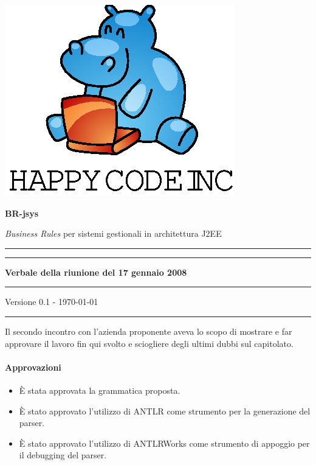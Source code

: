 \documentclass[11pt,titlepage,a4paper]{report}
\begin{document}
\begin{titlepage}
\begin{center}
\vspace*{0.5in}
\includegraphics{logo.eps}
\vspace*{0.2in}

{\Large \textbf{BR-jsys}}

{\Large \emph{Business Rules} per sistemi gestionali in architettura J2EE } 
\vspace{1.3in}
\par\rule{10cm}{.4pt} \par
\par\rule{12cm}{1pt} \par
\vspace*{0.5in}
\LARGE \textbf {Verbale della riunione del 17 gennaio 2008}
\vspace*{0.5in}
\par\rule{12cm}{1pt} \par
{\large Versione 0.1 - \today}
\par\rule{10cm}{.4pt} \par

\end{center}
\end{titlepage}
\vspace*{0.5in}

\thispagestyle{plain}
Il secondo incontro con l'azienda proponente aveva lo scopo di mostrare e far approvare il lavoro fin qui svolto e sciogliere degli ultimi dubbi sul capitolato.

\paragraph{Approvazioni}
\begin{itemize}

\item \`E stata approvata la grammatica proposta.
\item \`E stato approvato l'utilizzo di ANTLR come strumento per la generazione del parser.
\item \`E stato approvato l'utilizzo di ANTLRWorks come strumento di appoggio per il debugging del parser.

\end{itemize}
\end{document}
